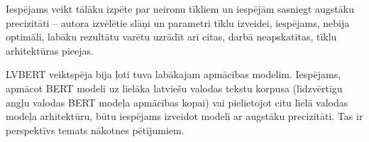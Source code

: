 Iespējams veikt tālāku izpēte par neironu tīkliem un iespējām sasniegt augstāku precizitāti – autora izvēlētie slāņi un parametri tīklu izveidei, iespējams, nebija optimāli, labāku rezultātu varētu uzrādīt arī citas, darbā neapskatītas, tīklu arhitektūras pieejas.

LVBERT veiktspēja bija ļoti tuva labākajam apmācības modelim. Iespējams, apmācot BERT modeli uz lielāka latviešu valodas tekstu korpusa (līdzvērtīgu angļu valodas BERT modeļa apmācības kopai) vai pielietojot citu lielā valodas modeļa arhitektūru, būtu iespējams izveidot modeli ar augstāku precizitāti. Tas ir perspektīvs temats nākotnes pētījumiem.